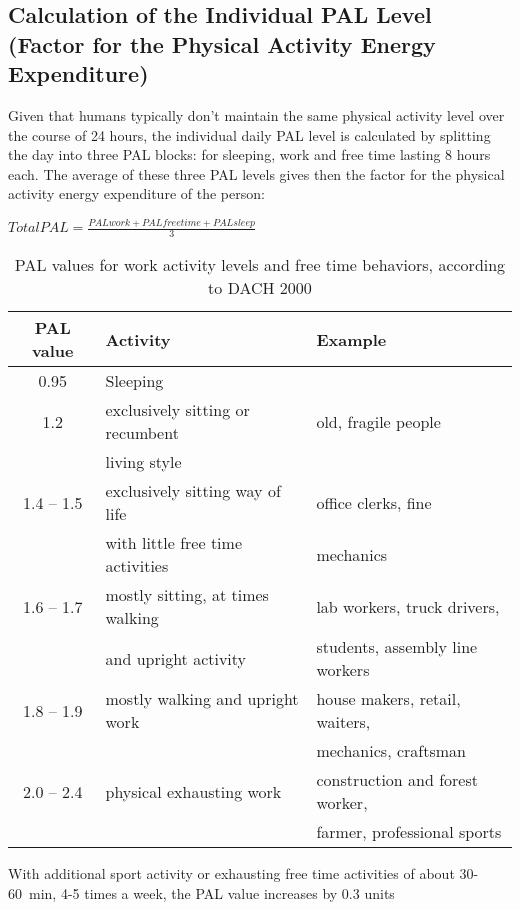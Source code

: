 \documentclass[../main.tex]{subfiles}
\begin{document}
\subsection[Calculation of the Individual PAL Level]{Calculation of the Individual PAL Level (Factor for the Physical Activity Energy Expenditure)}

Given that humans typically don't maintain the same physical activity level over the course of 24 hours, the individual daily PAL level is calculated by splitting the day into three PAL blocks: for sleeping, work and free time lasting 8 hours each.
The average of these three PAL levels gives then the factor for the physical activity energy expenditure of the person:

\vspace{2mm}

\begin{center}
\begin{fminipage}{7cm}
$ Total PAL = \frac{PAL work + PAL free time + PAL sleep}{3}$ 
\end{fminipage}
\end{center}

\vspace{2mm}

\begin{table}[htb]
  \centering
  \begin{tabular}{cll}
    \textbf{PAL value} & \textbf{Activity} & \textbf{Example} \\
    \hline
    0.95 & Sleeping \\
    1.2 & exclusively sitting or recumbent & old, fragile people \\
    & living style \\
    1.4 -- 1.5 & exclusively sitting way of life & office clerks, fine \\
              & with little free time activities  & mechanics \\
    1.6 -- 1.7& mostly sitting, at times walking& lab workers, truck drivers, \\
              & and upright activity & students, assembly line workers\\
    1.8 -- 1.9 & mostly walking and upright work & house makers, retail, waiters,\\
              & & mechanics, craftsman\\
    2.0 -- 2.4 & physical exhausting work & construction and forest worker, \\
    & & farmer, professional sports\\
  \end{tabular}
  \vspace{1mm}
  
  \noindent With additional sport activity or exhausting free time activities of about 30-60~min, 4-5 times a week, the PAL value increases by 0.3 units
  \caption{PAL values for work activity levels and free time behaviors, according to DACH 2000}
\end{table}
\end{document}
